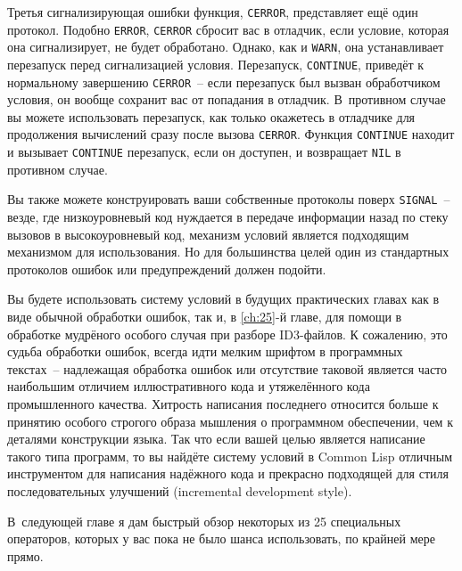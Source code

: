Третья сигнализирующая ошибки функция, \lstinline{CERROR}, представляет ещё один протокол.
Подобно \lstinline{ERROR}, \lstinline{CERROR} сбросит вас в отладчик, если условие, которая она
сигнализирует, не будет обработано. Однако, как и \lstinline{WARN}, она устанавливает перезапуск
перед сигнализацией условия. Перезапуск, \lstinline{CONTINUE}, приведёт к нормальному
завершению \lstinline{CERROR}~-- если перезапуск был вызван обработчиком условия, он вообще
сохранит вас от попадания в отладчик. В~противном случае вы можете использовать
перезапуск, как только окажетесь в отладчике для продолжения вычислений сразу после вызова
\lstinline{CERROR}. Функция \lstinline{CONTINUE} находит и вызывает \lstinline{CONTINUE} перезапуск, если
он доступен, и возвращает \lstinline{NIL} в противном случае.

Вы также можете конструировать ваши собственные протоколы поверх \lstinline{SIGNAL}~-- везде,
где низкоуровневый код нуждается в передаче информации назад по стеку вызовов в
высокоуровневый код, механизм условий является подходящим механизмом для использования. Но
для большинства целей один из стандартных протоколов ошибок или предупреждений должен
подойти.

Вы будете использовать систему условий в будущих практических главах как в виде обычной
обработки ошибок, так и, в \ref{ch:25}-й главе, для помощи в обработке мудрёного особого случая при
разборе ID3-файлов.  К сожалению, это судьба обработки ошибок, всегда идти мелким шрифтом
в программных текстах~-- надлежащая обработка ошибок или отсутствие таковой является
часто наибольшим отличием иллюстративного кода и утяжелённого кода промышленного качества.
Хитрость написания последнего относится больше к принятию особого строгого образа мышления
о программном обеспечении, чем к деталями конструкции языка. Так что если вашей целью
является написание такого типа программ, то вы найдёте систему условий в Common Lisp
отличным инструментом для написания надёжного кода и прекрасно подходящей для стиля
последовательных улучшений (incremental development style).

В~следующей главе я дам быстрый обзор некоторых из 25 специальных операторов, которых у
вас пока не было шанса использовать, по крайней мере прямо.

